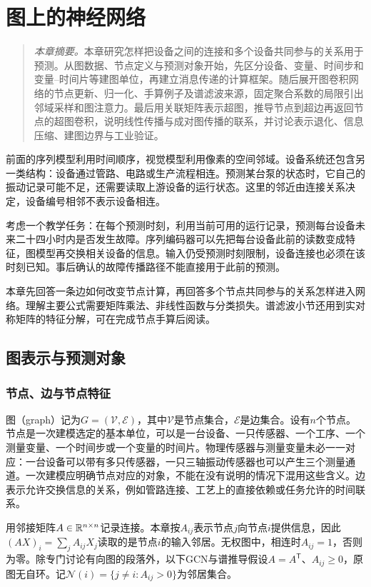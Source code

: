 \chapter{图上的神经网络}
\label{chap:graph-neural-networks}
\begin{quote}\small
\textit{本章摘要。}本章研究怎样把设备之间的连接和多个设备共同参与的关系用于预测。从图数据、节点定义与预测对象开始，先区分设备、变量、时间步和变量--时间片等建图单位，再建立消息传递的计算框架。随后展开图卷积网络的节点更新、归一化、手算例子及谱滤波来源，固定聚合系数的局限引出邻域采样和图注意力。最后用关联矩阵表示超图，推导节点到超边再返回节点的超图卷积，说明线性传播与成对图传播的联系，并讨论表示退化、信息压缩、建图边界与工业验证。
\end{quote}

前面的序列模型利用时间顺序，视觉模型利用像素的空间邻域。设备系统还包含另一类结构：设备通过管路、电路或生产流程相连。预测某台泵的状态时，它自己的振动记录可能不足，还需要读取上游设备的运行状态。这里的邻近由连接关系决定，设备编号相邻不表示设备相连。

考虑一个教学任务：在每个预测时刻，利用当前可用的运行记录，预测每台设备未来二十四小时内是否发生故障。序列编码器可以先把每台设备此前的读数变成特征，图模型再交换相关设备的信息。输入仍受预测时刻限制，设备连接也必须在该时刻已知。事后确认的故障传播路径不能直接用于此前的预测。

本章先回答一条边如何改变节点计算，再回答多个节点共同参与的关系怎样进入网络。理解主要公式需要矩阵乘法、非线性函数与分类损失。谱滤波小节还用到实对称矩阵的特征分解，可在完成节点手算后阅读。

\section{图表示与预测对象}
\subsection{节点、边与节点特征}
图（graph）记为$G=(\mathcal V,\mathcal E)$，其中$\mathcal V$是节点集合，$\mathcal E$是边集合。设有$n$个节点。节点是一次建模选定的基本单位，可以是一台设备、一只传感器、一个工序、一个测量变量、一个时间步或一个变量的时间片。物理传感器与测量变量未必一一对应：一台设备可以带有多只传感器，一只三轴振动传感器也可以产生三个测量通道。一次建模应明确节点对应的对象，不能在没有说明的情况下混用这些含义。边表示允许交换信息的关系，例如管路连接、工艺上的直接依赖或任务允许的时间联系。

用邻接矩阵$A\in\mathbb{R}^{n\times n}$记录连接。本章按$A_{ij}$表示节点$j$向节点$i$提供信息，因此$(AX)_i=\sum_j A_{ij}X_j$读取的是节点$i$的输入邻居。无权图中，相连时$A_{ij}=1$，否则为零。除专门讨论有向图的段落外，以下GCN与谱推导假设$A=A^{\mathsf T}$、$A_{ij}\geq0$，原图无自环。记$\mathcal N(i)=\{j\ne i:A_{ij}>0\}$为邻居集合。

